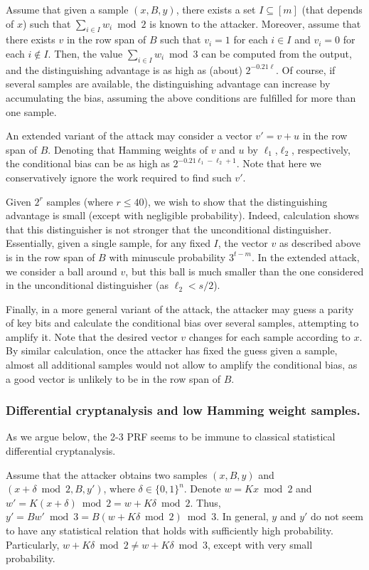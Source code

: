 \documentclass[orivec,envcountsect]{llncs}
\begin{document}
Assume that given a sample $(x,B,y)$, 
there exists a set $I \subseteq [m]$ (that depends of $x$)
such that $\sum_{i \in I} w_i \bmod 2$ is known to the attacker.
Moreover, assume that there exists $v$ in the row span of $B$
such that $v_i = 1$ for each $i \in I$ and $v_i = 0$
for each $i \notin I$.
Then, the value $\sum_{i \in I} w_i \bmod 3$ can be computed from
the output, and the distinguishing advantage is as high as (about) $2^{-0.21\ell}$.
Of course, if several samples are available, the distinguishing advantage can
increase by accumulating the bias,
assuming the above conditions are fulfilled for more than one sample.

An extended variant of the attack may consider a vector
$v' = v + u$ in the row span of $B$.
Denoting that Hamming weights of $v$ and $u$ by $\ell_1$,$\ell_2$, respectively,
the conditional bias can be as high as $2^{-0.21\ell_1 - \ell_2 + 1}$.
Note that here we conservatively ignore the work required to find such $v'$.

Given $2^r$ samples (where $r \leq 40$),
we wish to show that the distinguishing advantage is small
(except with negligible probability).
Indeed, calculation shows that this distinguisher is not stronger that the
unconditional distinguisher.
Essentially, given a single sample, for any fixed $I$, the vector $v$ as described above
is in the row span of $B$ with minuscule probability $3^{t - m}$.
In the extended attack, we consider a ball around $v$, but this ball
is much smaller than the one considered in the unconditional distinguisher (as $\ell_2 < s/2$).

Finally, in a more general variant of the attack,
the attacker may guess a parity of key bits and calculate the conditional bias over several samples,
attempting to amplify it.
Note that the desired vector $v$ changes for each sample according to $x$.
By similar calculation, once the attacker has fixed the guess given a sample,
almost all additional samples would not allow to amplify the conditional bias, 
as a good vector is unlikely to be in the row span of $B$.

\subsubsection{Differential cryptanalysis and low Hamming weight samples.}
As we argue below, the 2-3 PRF seems to be immune to classical statistical differential cryptanalysis.

Assume that the attacker obtains two samples $(x,B,y)$ and $(x+\delta \bmod 2,B,y')$, where $\delta \in \{0,1\}^n$.
Denote $w = K x \bmod 2$ and $w' = K (x + \delta) \bmod 2 = w + K \delta \bmod 2$.
Thus, $y' = B w' \bmod 3 = B (w + K \delta \bmod 2 ) \bmod 3$.
In general, $y$ and $y'$ do not seem to have any statistical relation that holds with sufficiently high probability.
Particularly, $w + K \delta \bmod 2 \neq w + K \delta \bmod 3$,
except with very small probability.
\end{document}
